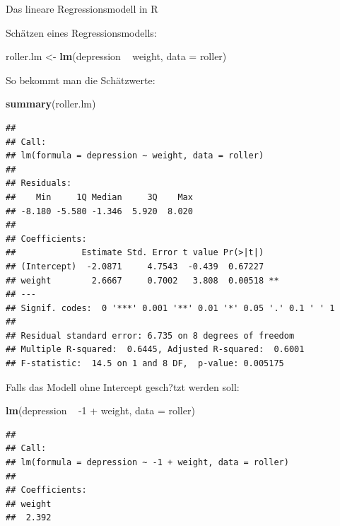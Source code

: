 \documentclass[ignorenonframetext,]{beamer}
\newenvironment{Shaded}{}{}
\newcommand{\KeywordTok}[1]{\textcolor[rgb]{0.00,0.44,0.13}{\textbf{{#1}}}}
\newcommand{\DataTypeTok}[1]{\textcolor[rgb]{0.56,0.13,0.00}{{#1}}}
\newcommand{\DecValTok}[1]{\textcolor[rgb]{0.25,0.63,0.44}{{#1}}}
\newcommand{\StringTok}[1]{\textcolor[rgb]{0.25,0.44,0.63}{{#1}}}
\newcommand{\NormalTok}[1]{{#1}}
\begin{document}
\begin{frame}[fragile]{Das lineare Regressionsmodell in R}

Schätzen eines Regressionsmodells:

\begin{Shaded}
\begin{Highlighting}[]
\NormalTok{roller.lm <-}\StringTok{ }\KeywordTok{lm}\NormalTok{(depression ~}\StringTok{ }\NormalTok{weight, }\DataTypeTok{data =} \NormalTok{roller)}
\end{Highlighting}
\end{Shaded}

So bekommt man die Schätzwerte:

\begin{Shaded}
\begin{Highlighting}[]
\KeywordTok{summary}\NormalTok{(roller.lm)}
\end{Highlighting}
\end{Shaded}

\begin{verbatim}
## 
## Call:
## lm(formula = depression ~ weight, data = roller)
## 
## Residuals:
##    Min     1Q Median     3Q    Max 
## -8.180 -5.580 -1.346  5.920  8.020 
## 
## Coefficients:
##             Estimate Std. Error t value Pr(>|t|)   
## (Intercept)  -2.0871     4.7543  -0.439  0.67227   
## weight        2.6667     0.7002   3.808  0.00518 **
## ---
## Signif. codes:  0 '***' 0.001 '**' 0.01 '*' 0.05 '.' 0.1 ' ' 1
## 
## Residual standard error: 6.735 on 8 degrees of freedom
## Multiple R-squared:  0.6445, Adjusted R-squared:  0.6001 
## F-statistic:  14.5 on 1 and 8 DF,  p-value: 0.005175
\end{verbatim}

Falls das Modell ohne Intercept gesch?tzt werden soll:

\begin{Shaded}
\begin{Highlighting}[]
\KeywordTok{lm}\NormalTok{(depression ~}\StringTok{ }\NormalTok{-}\DecValTok{1} \NormalTok{+}\StringTok{ }\NormalTok{weight, }\DataTypeTok{data =} \NormalTok{roller)}
\end{Highlighting}
\end{Shaded}

\begin{verbatim}
## 
## Call:
## lm(formula = depression ~ -1 + weight, data = roller)
## 
## Coefficients:
## weight  
##  2.392
\end{verbatim}

\end{frame}
\end{document}
